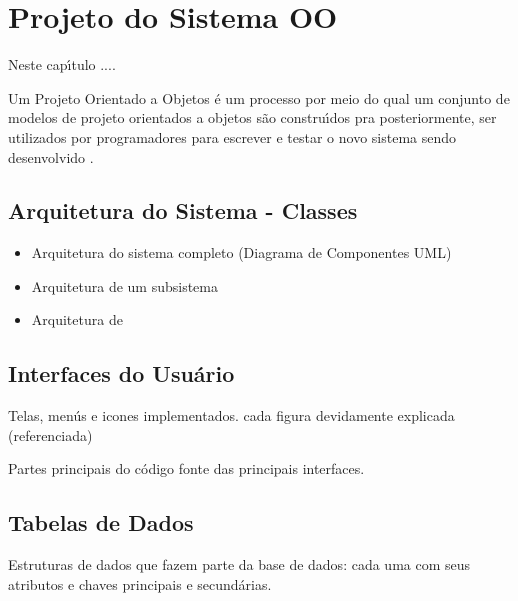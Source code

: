 
\chapter{Projeto do Sistema OO}

Neste cap\'{\i}tulo ....


Um Projeto Orientado a Objetos \'{e} um processo por meio do qual um conjunto de modelos de projeto orientados a objetos s\~{a}o constru\'{\i}dos pra posteriormente, ser utilizados por programadores para escrever e testar o novo sistema sendo desenvolvido  \cite{Satzinger2012}.

   \section{Arquitetura do Sistema - Classes}
   \begin{itemize}
     \item Arquitetura do sistema completo (Diagrama de Componentes UML)
     \item Arquitetura de um subsistema
     \item Arquitetura de
   \end{itemize}



   \section{Interfaces do Usu\'{a}rio}
   Telas, men\'{u}s e icones implementados. cada figura devidamente explicada (referenciada)

   Partes principais do c\'{o}digo fonte das principais interfaces.


   \section{Tabelas de Dados}
   Estruturas de dados que fazem parte da base de dados: cada uma com seus atributos e chaves principais e secund\'{a}rias.     